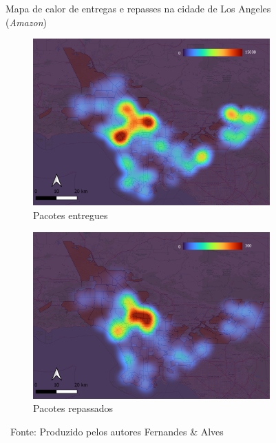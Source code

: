 \begin{figure}[htb]
    \centering
    \caption{Mapa de calor de entregas e repasses na cidade de Los Angeles (\textit{Amazon})} \label{fig:heatmapAmazon1}
    \begin{subfigure}{0.49\textwidth}
        \caption{Pacotes entregues}
        \includegraphics[width=\textwidth]{images/6_amazon/rep_e_dev/los_angeles_entregas.png}
    \end{subfigure}
    \begin{subfigure}{0.49\textwidth}
        \caption{Pacotes repassados}
        \includegraphics[width=\textwidth]{images/6_amazon/rep_e_dev/los_angeles_failed.png}
    \end{subfigure}
    \caption*{\ Fonte: Produzido pelos autores Fernandes \& Alves}
\end{figure}

